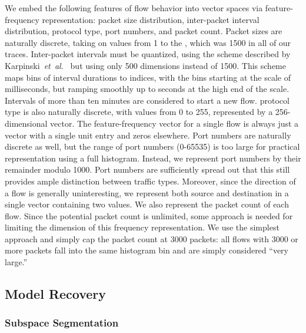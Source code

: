 \documentclass{acm_proc_article-sp}
\begin{document}
We embed the following features of flow behavior into vector spaces via feature-frequency representation:
packet size distribution,
inter-packet interval distribution,
 protocol type,
 port numbers,
and packet count.
%
Packet sizes are naturally discrete, taking on values from 1 to the , which was 1500 in all of our traces.
%
Inter-packet intervals must be quantized, using the scheme described by Karpinski~\emph{et~al.}~\cite{Karpinski08} but using only 500 dimensions instead of 1500.
This scheme maps bins of interval durations to indices, with the bins starting at the scale of milliseconds, but ramping smoothly up to seconds at the high end of the scale.
Intervals of more than ten minutes are considered to start a new flow.
%
 protocol type is also naturally discrete, with values from 0 to 255, represented by a 256-dimensional vector.
The feature-frequency vector for a single flow is always just a vector with a single unit entry and zeros elsewhere.
%
Port numbers are naturally discrete as well, but the range of port numbers (0-65535) is too large for practical representation using a full histogram.
Instead, we represent port numbers by their remainder modulo 1000.
Port numbers are sufficiently spread out that this still provides ample distinction between traffic types.
Moreover, since the direction of a flow is generally uninteresting, we represent both source and destination in a single vector containing two values.
%
We also represent the packet count of each flow.
Since the potential packet count is unlimited, some approach is needed for limiting the dimension of this frequency representation.
We use the simplest approach and simply cap the packet count at 3000 packets:
all flows with 3000 or more packets fall into the same histogram bin and are simply considered ``very large.''

\subsection{Model Recovery}

\subsubsection{Subspace Segmentation}
\end{document}
